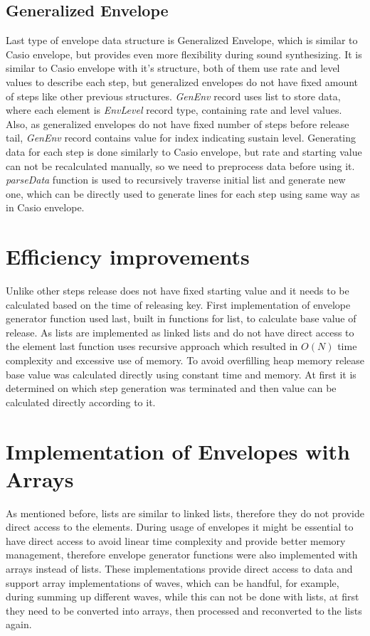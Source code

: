 \documentclass[runningheads]{llncs}
\begin{document}
\subsection{Generalized Envelope}

Last type of envelope data structure is Generalized Envelope, which is similar to Casio envelope, but provides even more flexibility during sound synthesizing. It is similar to Casio envelope with it’s structure, both of them use rate and level values to describe each step, but generalized envelopes do not have fixed amount of steps like other previous structures. \textit{GenEnv} record uses list to store data, where each element is \textit{EnvLevel} record type, containing rate and level values. Also, as generalized envelopes do not have fixed number of steps before release tail, \textit{GenEnv} record contains value for index indicating sustain level. Generating data for each step is done similarly to Casio envelope, but rate and starting value can not be recalculated manually, so we need to preprocess data before using it. \textit{parseData} function is used to recursively traverse initial list and generate new one, which can be directly used to generate lines for each step using same way as in Casio envelope. 

\section{Efficiency improvements}

Unlike other steps release does not have fixed starting value and it needs to be calculated based on the time of releasing key. First implementation of envelope generator function used last, built in functions for list, to calculate base value of release. As lists are implemented as linked lists and do not have direct access to the element last function uses recursive approach which resulted in \(O(N)\) time complexity and excessive use of memory. To avoid overfilling heap memory release base value was calculated directly using constant time and memory. At first it is determined on which step generation was terminated and then value can be calculated directly according to it. 

\section{Implementation of Envelopes with Arrays}

As mentioned before, lists are similar to linked lists, therefore they do not provide direct access to the elements. During usage of envelopes it might be essential to have direct access to avoid linear time complexity and provide better memory management, therefore envelope generator functions were also implemented with arrays instead of lists. These implementations provide direct access to data and support array implementations of waves, which can be handful, for example, during summing up different waves, while this can not be done with lists, at first they need to be converted into arrays, then processed and reconverted to the lists again.
\end{document}
